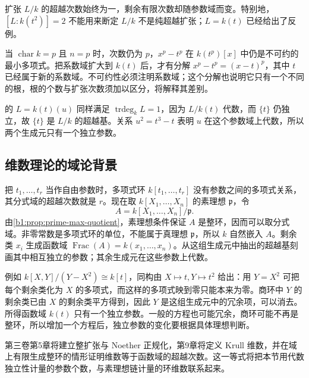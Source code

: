 \ProseParagraphBreak
扩张 \(L/k\) 的超越次数始终为一，剩余有限次数却随参数域而变。特别地，\([L:k(t^2)]=2\) 不能用来断定 \(L/k\) 不是纯超越扩张；\(L=k(t)\) 已经给出了反例。

\ProseParagraphBreak
当 \(\operatorname{char}k=p\) 且 \(n=p\) 时，次数仍为 \(p\)，\(x^p-t^p\) 在 \(k(t^p)[x]\) 中仍是不可约的最小多项式。把系数域扩大到 \(k(t)\) 后，才有分解 \(x^p-t^p=(x-t)^p\)，其中 \(t\) 已经属于新的系数域。不可约性必须注明系数域；这个分解也说明它只有一个不同的根，根的个数与扩张次数须加以区分，将解释其差别。

\ProseParagraphBreak
{}的 \(L=k(t)(u)\) 同样满足 \(\operatorname{trdeg}_k L=1\)，因为 \(L/k(t)\) 代数，而 \(\{t\}\) 仍独立，故 \(\{t\}\) 是 \(L/k\) 的超越基。关系 \(u^2=t^3-t\) 表明 \(u\) 在这个参数域上代数，所以两个生成元只有一个独立参数。

\subsection{维数理论的域论背景}
\label{b1:subsec:1404:03}

把 \(t_1,\ldots,t_r\) 当作自由参数时，多项式环 \(k[t_1,\ldots,t_r]\) 没有参数之间的多项式关系，其分式域的超越次数就是 \(r\)。现在取 \(k[X_1,\ldots,X_n]\) 的素理想 \(\mathfrak p\)，令
\[
	A=k[X_1,\ldots,X_n]/\mathfrak p.
\]
由\cref{b1:prop:prime-max-quotient}，素理想条件保证 \(A\) 是整环，因而可以取分式域。非零常数是多项式环的单位，不能属于真理想 \(\mathfrak p\)，所以 \(k\) 自然嵌入 \(A\)。剩余类 \(x_i\) 生成函数域 \(\operatorname{Frac}(A)=k(x_1,\ldots,x_n)\)。从这组生成元中抽出的超越基刻画其中相互独立的参数；其余生成元在这些参数上代数。

\ProseParagraphBreak
例如 \(k[X,Y]/(Y-X^2)\cong k[t]\)，同构由 \(X\mapsto t,Y\mapsto t^2\) 给出：用 \(Y=X^2\) 可把每个剩余类化为 \(X\) 的多项式，而这样的多项式映到零只能本来为零。商环中 \(Y\) 的剩余类已由 \(X\) 的剩余类平方得到，因此 \(Y\) 是这组生成元中的冗余项，可以消去。所得函数域 \(k(t)\) 只有一个独立参数。一般的方程也可能冗余，商环可能不再是整环，所以增加一个方程后，独立参数的变化要根据具体理想判断。

\ProseParagraphBreak
第三卷第5章将建立整扩张与 Noether 正规化，第9章将定义 Krull 维数，并在域上有限生成整环的情形证明维数等于函数域的超越次数。这一等式将把本节用代数独立性计量的参数个数，与素理想链计量的环维数联系起来。
